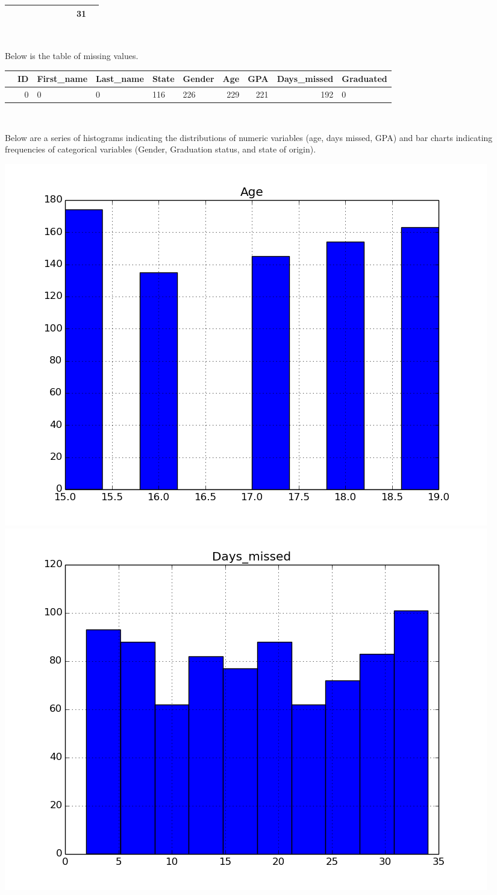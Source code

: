 \documentclass[a4paper]{article}
\begin{document}
\begin{enumerate}
\begin{tabular}{lrllllrrrl}
 &  &         &        &     &      &   &   &           31 &        \\
\bottomrule
\end{tabular}
\\
\par
Below is the table of missing values.
\\
\par
\begin{tabular}{lrllllrrrl}
\toprule
{} &  ID & First\_name & Last\_name &  State &  Gender &  Age &  GPA &  Days\_missed & Graduated \\
\midrule
& 0 &  0 & 0 & 116 & 226 & 229 & 221 & 192 & 0 \\
\bottomrule
\end{tabular}
\\
\par  
Below are a series of histograms indicating the distributions of numeric variables (age, days missed, GPA) and bar charts indicating frequencies of categorical variables (Gender, Graduation status, and state of origin).
\begin{center}
\includegraphics[width=.7\textwidth]{../graphics/Age.png}
\\
\includegraphics[width=.7\textwidth]{../graphics/Days_missed.png}

\end{center}
\end{enumerate}
\end{document}
